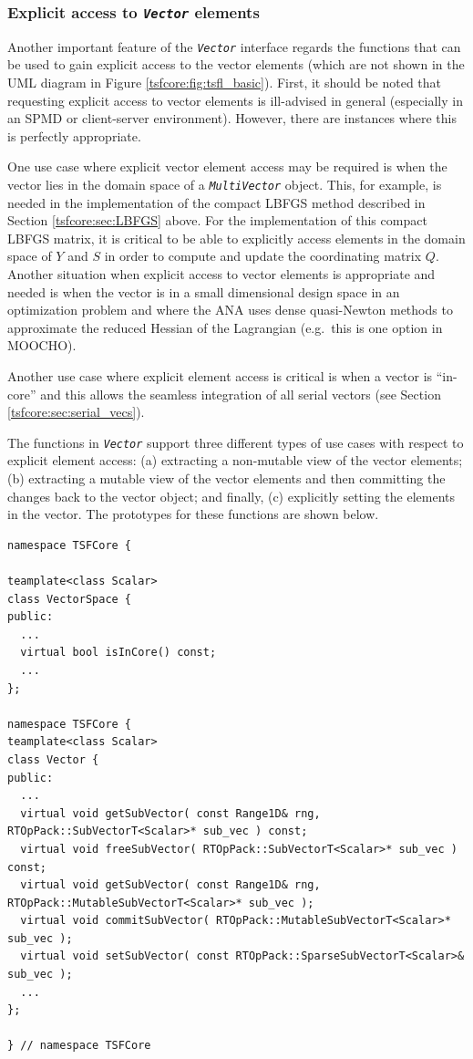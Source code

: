 %
\subsubsection{Explicit access to {}\texttt{\textit{Vector}} elements}
\label{tsfcore:sec:explicit_vec_access}
%

Another important feature of the {}\texttt{\textit{Vector}} interface
regards the functions that can be used to gain explicit access to the
vector elements (which are not shown in the UML diagram in Figure
{}\ref{tsfcore:fig:tsfl_basic}).  First, it should be noted that
requesting explicit access to vector elements is ill-advised in
general (especially in an SPMD or client-server environment).
However, there are instances where this is perfectly appropriate.

One use case where explicit vector element access may be required is
when the vector lies in the domain space of a
{}\texttt{\textit{Multi\-Vector}} object.  This, for example, is
needed in the implementation of the compact LBFGS method described in
Section {}\ref{tsfcore:sec:LBFGS} above.  For the implementation of
this compact LBFGS matrix, it is critical to be able to explicitly
access elements in the domain space of $Y$ and $S$ in order to compute
and update the coordinating matrix $Q$.  Another situation when
explicit access to vector elements is appropriate and needed is when
the vector is in a small dimensional design space in an optimization
problem and where the ANA uses dense quasi-Newton methods to
approximate the reduced Hessian of the Lagrangian (e.g.~this is one
option in MOOCHO).

Another use case where explicit element access is critical is when a
vector is ``in-core'' and this allows the seamless integration of all
serial vectors (see Section {}\ref{tsfcore:sec:serial_vecs}).

The functions in {}\texttt{\textit{Vector}} support three different
types of use cases with respect to explicit element access: (a)
extracting a non-mutable view of the vector elements; (b) extracting a
mutable view of the vector elements and then committing the changes
back to the vector object; and finally, (c) explicitly setting the
elements in the vector.  The prototypes for these functions are shown
below.

{\scriptsize\begin{verbatim}
namespace TSFCore {

teamplate<class Scalar>
class VectorSpace {
public:
  ...
  virtual bool isInCore() const;
  ...
};

namespace TSFCore {
teamplate<class Scalar>
class Vector {
public:
  ...
  virtual void getSubVector( const Range1D& rng, RTOpPack::SubVectorT<Scalar>* sub_vec ) const;
  virtual void freeSubVector( RTOpPack::SubVectorT<Scalar>* sub_vec ) const;
  virtual void getSubVector( const Range1D& rng, RTOpPack::MutableSubVectorT<Scalar>* sub_vec );
  virtual void commitSubVector( RTOpPack::MutableSubVectorT<Scalar>* sub_vec );
  virtual void setSubVector( const RTOpPack::SparseSubVectorT<Scalar>& sub_vec );
  ...
};

} // namespace TSFCore
\end{verbatim}}

